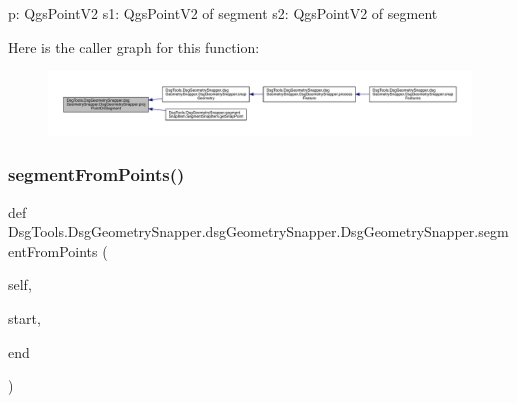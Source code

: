 \begin{DoxyVerb}p: QgsPointV2
s1: QgsPointV2 of segment
s2: QgsPointV2 of segment
\end{DoxyVerb}
 Here is the caller graph for this function\+:
\nopagebreak
\begin{figure}[H]
\begin{center}
\leavevmode
\includegraphics[width=350pt]{class_dsg_tools_1_1_dsg_geometry_snapper_1_1dsg_geometry_snapper_1_1_dsg_geometry_snapper_ab2012cc6e7509f8f00a47bab2dc98b8c_icgraph}
\end{center}
\end{figure}
\mbox{\label{class_dsg_tools_1_1_dsg_geometry_snapper_1_1dsg_geometry_snapper_1_1_dsg_geometry_snapper_ad51384d8b24f5564aefc5800505cadaf}} 
\subsubsection{\texorpdfstring{segment\+From\+Points()}{segmentFromPoints()}}
{\footnotesize\ttfamily def Dsg\+Tools.\+Dsg\+Geometry\+Snapper.\+dsg\+Geometry\+Snapper.\+Dsg\+Geometry\+Snapper.\+segment\+From\+Points (\begin{DoxyParamCaption}\item[{}]{self,  }\item[{}]{start,  }\item[{}]{end }\end{DoxyParamCaption})}

